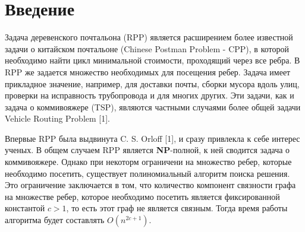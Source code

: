 \section{Введение}
    Задача деревенского почтальона (\textsf{RPP}) является расширением более известной задачи о китайском почтальоне (\textsf{Chinese Postman Problem - CPP}), в которой необходимо найти цикл минимальной стоимости, проходящий через все ребра. В \textsf{RPP} же задается множество необходимых для посещения ребер. Задача имеет прикладное значение, например, для доставки почты, сборки мусора вдоль улиц, проверки на исправность трубопровода и для многих других. Эти задачи, как и задача о коммивояжере (\textsf{TSP}), являются частными случаями более общей задачи \textsf{Vehicle Routing Problem} [1]. 
    
    Впервые \textsf{RPP} была выдвинута C. S. Orloff [1], и сразу привлекла к себе интерес ученых.
    В общем случаем \textsf{RPP} является \textbf{NP}-полной, к ней сводится задача о коммивояжере.
    Однако при некоторм ограничени на множество ребер, которые необходимо посетить, существует полиномиальный алгоритм поиска решения. Это ограничение заключается в том, что количество компонент связности графа на множестве ребер, которое необходимо посетить является фиксированной константой $c > 1$, то есть этот граф не является связным. Тогда время работы алгоритма будет составлять  $O(n^{2c+1})$. 